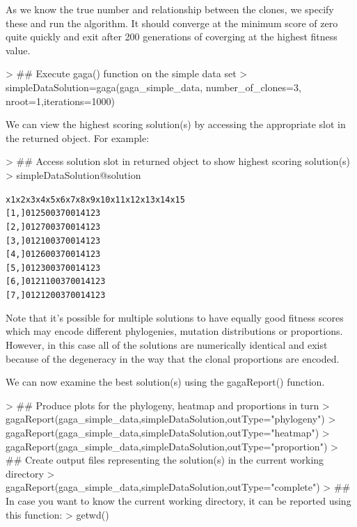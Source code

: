 \documentclass{article}
\begin{document}
As we know the true number and relationship between the clones, we specify these and run the algorithm.  It should converge at the minimum score of zero quite quickly and exit after 200 generations of coverging at the highest fitness value.

\begin{Schunk}
\begin{Sinput}
> ## Execute gaga() function on the simple data set
> simpleDataSolution=gaga(gaga_simple_data, number_of_clones=3, nroot=1,iterations=1000)
\end{Sinput}
\end{Schunk}

We can view the highest scoring solution(s) by accessing the appropriate slot in the returned object.  For example:

\begin{Schunk}
\begin{Sinput}
> ## Access solution slot in returned object to show highest scoring solution(s)
> simpleDataSolution@solution
\end{Sinput}
\end{Schunk}
\begin{alltt}
     x1 x2 x3 x4 x5 x6 x7 x8 x9 x10 x11 x12 x13 x14 x15
[1,]  0  1  2  5  0  0  3  7  0   0   1   4   1   2   3
[2,]  0  1  2  7  0  0  3  7  0   0   1   4   1   2   3
[3,]  0  1  2  1  0  0  3  7  0   0   1   4   1   2   3
[4,]  0  1  2  6  0  0  3  7  0   0   1   4   1   2   3
[5,]  0  1  2  3  0  0  3  7  0   0   1   4   1   2   3
[6,]  0  1  2 11  0  0  3  7  0   0   1   4   1   2   3
[7,]  0  1  2 12  0  0  3  7  0   0   1   4   1   2   3
\end{alltt}

Note that it's possible for multiple solutions to have equally good fitness scores which may encode different phylogenies, mutation distributions or proportions.  However, in this case all of the solutions are numerically identical and exist because of the degeneracy in the way that the clonal proportions are encoded.

We can now examine the best solution(s) using the gagaReport() function.  

\begin{Schunk}
\begin{Sinput}
> ## Produce plots for the phylogeny, heatmap and proportions in turn
> gagaReport(gaga_simple_data,simpleDataSolution,outType="phylogeny")
> gagaReport(gaga_simple_data,simpleDataSolution,outType="heatmap")
> gagaReport(gaga_simple_data,simpleDataSolution,outType="proportion")
> ## Create output files representing the solution(s) in the current working directory
> gagaReport(gaga_simple_data,simpleDataSolution,outType="complete")
> ## In case you want to know the current working directory, it can be reported using this function:
> getwd()
\end{Sinput}
\end{Schunk}
\end{document}
